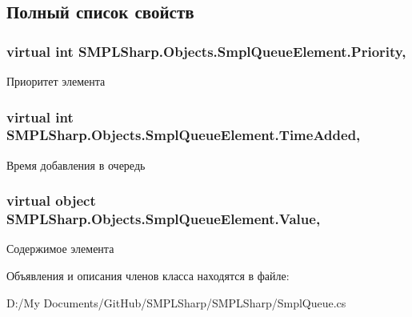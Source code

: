 \subsection{Полный список свойств}
\hypertarget{class_s_m_p_l_sharp_1_1_objects_1_1_smpl_queue_element_a90590a8e8518db73ed29b3f932f29e5e}{
\subsubsection[{Priority}]{\setlength{\rightskip}{0pt plus 5cm}virtual int S\-M\-P\-L\-Sharp.\-Objects.\-Smpl\-Queue\-Element.\-Priority\hspace{0.3cm}{\ttfamily [get]}, {\ttfamily [set]}}}\label{d3/d48/class_s_m_p_l_sharp_1_1_objects_1_1_smpl_queue_element_a90590a8e8518db73ed29b3f932f29e5e}


Приоритет элемента 

\hypertarget{class_s_m_p_l_sharp_1_1_objects_1_1_smpl_queue_element_a9bc2b0c2b6dce324521551f4333f9c5c}{
\subsubsection[{Time\-Added}]{\setlength{\rightskip}{0pt plus 5cm}virtual int S\-M\-P\-L\-Sharp.\-Objects.\-Smpl\-Queue\-Element.\-Time\-Added\hspace{0.3cm}{\ttfamily [get]}, {\ttfamily [set]}}}\label{d3/d48/class_s_m_p_l_sharp_1_1_objects_1_1_smpl_queue_element_a9bc2b0c2b6dce324521551f4333f9c5c}


Время добавления в очередь 

\hypertarget{class_s_m_p_l_sharp_1_1_objects_1_1_smpl_queue_element_aa16777046bf5b47815ff3c8ccab88407}{
\subsubsection[{Value}]{\setlength{\rightskip}{0pt plus 5cm}virtual object S\-M\-P\-L\-Sharp.\-Objects.\-Smpl\-Queue\-Element.\-Value\hspace{0.3cm}{\ttfamily [get]}, {\ttfamily [set]}}}\label{d3/d48/class_s_m_p_l_sharp_1_1_objects_1_1_smpl_queue_element_aa16777046bf5b47815ff3c8ccab88407}


Содержимое элемента 



Объявления и описания членов класса находятся в файле\-:\begin{DoxyCompactItemize}
\item 
D\-:/\-My Documents/\-Git\-Hub/\-S\-M\-P\-L\-Sharp/\-S\-M\-P\-L\-Sharp/Smpl\-Queue.\-cs\end{DoxyCompactItemize}
